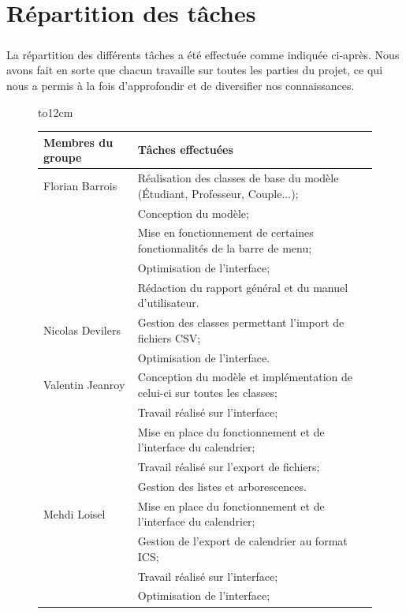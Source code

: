 \documentclass[a4paper,10pt]{report}
\begin{document}
  \chapter{Répartition des tâches}
    \paragraph{}
      La répartition des différents tâches a été effectuée comme indiquée ci-après.
      Nous avons fait en sorte que chacun travaille sur toutes les parties du projet, ce qui nous a permis à la fois d'approfondir et de diversifier nos connaissances.

      \begin{figure}[H]
	\hbox to12cm{\hss
	  \begin{tabular}{|l|l|}
	    \hline
	    \textbf{Membres du groupe} & \textbf{Tâches effectuées} \\
	    \hline
	      Florian Barrois 
	      & Réalisation des classes de base du modèle (Étudiant, Professeur, Couple...); \\
	      & Conception du modèle; \\
	      & Mise en fonctionnement de certaines fonctionnalités de la barre de menu;\\
	      & Optimisation de l'interface;\\
	      & Rédaction du rapport général et du manuel d'utilisateur.\\
	    \hline
	      Nicolas Devilers 
	      & Gestion des classes permettant l'import de fichiers CSV;\\
	      & Optimisation de l'interface.\\
	      \hline
	      Valentin Jeanroy 
	      & Conception du modèle et implémentation de celui-ci sur toutes les classes; \\
	      & Travail réalisé sur l'interface;\\
	      & Mise en place du fonctionnement et de l'interface du calendrier;\\
	      & Travail réalisé sur l'export de fichiers;\\
	      & Gestion des listes et arborescences.\\
	      \hline
	      Mehdi Loisel 
	      & Mise en place du fonctionnement et de l'interface du calendrier; \\
	      & Gestion de l'export de calendrier au format ICS;\\
	      & Travail réalisé sur l'interface;\\
	      & Optimisation de l'interface;\\

\end{tabular}}
\end{figure}
\end{document}
